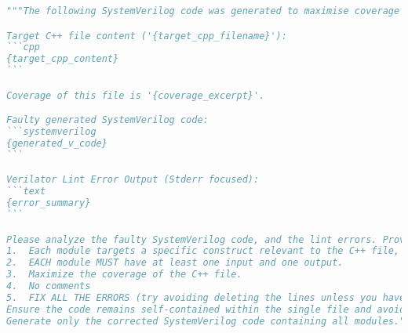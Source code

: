 \begin{lstlisting}[language=python,caption={Feedback prompt template},label={lst:feedback-prompt-template},breaklines=true]
"""The following SystemVerilog code was generated to maximise coverage of the Verilator C++ file '{target_cpp_filename}', but it failed linting (`verilator --lint-only -Wall --no-timing`). The goal was to generate MULTIPLE modules, each targeting a specific construct, each module having an input and an output port.

Target C++ file content ('{target_cpp_filename}'):
```cpp
{target_cpp_content}
```

Coverage of this file is '{coverage_excerpt}'.

Faulty generated SystemVerilog code:
```systemverilog
{generated_v_code}
```

Verilator Lint Error Output (Stderr focused):
```text
{error_summary}
```

Please analyze the faulty SystemVerilog code, and the lint errors. Provide a corrected version of the SystemVerilog code that fixes the lint error(s) while adhering strictly to ALL the requirements:
1.  Each module targets a specific construct relevant to the C++ file, try not to simplify too much the code.
2.  EACH module MUST have at least one input and one output.
3.  Maximize the coverage of the C++ file.
4.  No comments
5.  FIX ALL THE ERRORS (try avoiding deleting the lines unless you have absolutely no idea how to fix the error).
Ensure the code remains self-contained within the single file and avoids simulation-specific constructs or timing delays.
Generate only the corrected SystemVerilog code containing all modules."""
\end{lstlisting}